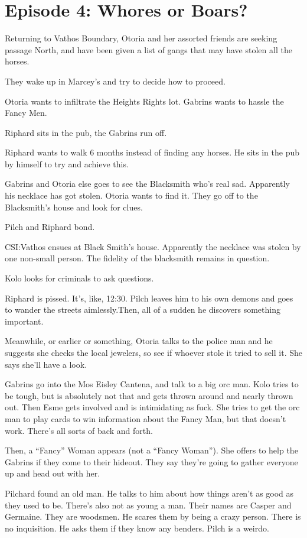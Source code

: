 \section{Episode 4: Whores or Boars?}

Returning to Vathos Boundary, Otoria and her assorted friends are seeking passage North, and have been given a list of gangs that may have stolen all the horses.

They wake up in Marcey’s and try to decide how to proceed.

Otoria wants to infiltrate the Heights Rights lot. Gabrins wants to hassle the Fancy Men.

Riphard sits in the pub, the Gabrins run off.

Riphard wants to walk 6 months instead of finding any horses. He sits in the pub by himself to try and achieve this.

Gabrins and Otoria else goes to see the Blacksmith who’s real sad. Apparently his necklace has got stolen. Otoria wants to find it. They go off to the Blacksmith’s house and look for clues.

Pilch and Riphard bond.

CSI:Vathos ensues at Black Smith’s house. Apparently the necklace was stolen by one non-small person. The fidelity of the blacksmith remains in question.

Kolo looks for criminals to ask questions.

Riphard is pissed. It’s, like, 12:30. Pilch leaves him to his own demons and goes to wander the streets aimlessly.Then, all of a sudden he discovers something important.

Meanwhile, or earlier or something, Otoria talks to the police man and he suggests she checks the local jewelers, so see if whoever stole it tried to sell it. She says she’ll have a look.

Gabrins go into the Mos Eisley Cantena, and talk to a big orc man. Kolo tries to be tough, but is absolutely not that and gets thrown around and nearly thrown out. Then Esme gets involved and is intimidating as fuck. She tries to get the orc man to play cards to win information about the Fancy Man, but that doesn’t work. There’s all sorts of back and forth.

Then, a “Fancy” Woman appears (not a “Fancy Woman”). She offers to help the Gabrins if they come to their hideout. They say they’re going to gather everyone up and head out with her.

Pilchard found an old man. He talks to him about how things aren’t as good as they used to be. There’s also not as young a man. Their names are Casper and Germaine. They are woodsmen. He scares them by being a crazy person. There is no inquisition. He asks them if they know any benders. Pilch is a weirdo.

